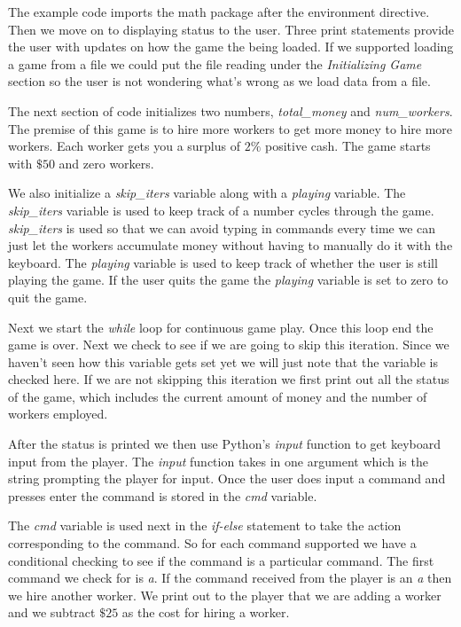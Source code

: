 The example code imports the math package after the environment directive. Then we move on to displaying status to the user. Three print statements provide the user with updates on how the game the being loaded. If we supported loading a game from a file we could put the file reading under the \emph{Initializing Game} section so the user is not wondering what's wrong as we load data from a file. 

The next section of code initializes two numbers, \emph{total\_money} and \emph{num\_workers}. The premise of this game is to hire more workers to get more money to hire more workers. Each worker gets you a surplus of $2\%$ positive cash. The game starts with $\$50$ and zero workers. 

We also initialize a \emph{skip\_iters} variable along with a \emph{playing} variable. The \emph{skip\_iters} variable is used to keep track of a number cycles through the game. \emph{skip\_iters} is used so that we can avoid typing in commands every time we can just let the workers accumulate money without having to manually do it with the keyboard. The \emph{playing} variable is used to keep track of whether the user is still playing the game. If the user quits the game the \emph{playing} variable is set to zero to quit the game. 

Next we start the \emph{while} loop for continuous game play. Once this loop end the game is over. Next we check to see if we are going to skip this iteration. Since we haven't seen how this variable gets set yet we will just note that the variable is checked here. If we are not skipping this iteration we first print out all the status of the game, which includes the current amount of money and the number of workers employed. 

After the status is printed we then use Python's \emph{input} function to get keyboard input from the player. The \emph{input} function takes in one argument which is the string prompting the player for input. Once the user does input a command and presses enter the command is stored in the \emph{cmd} variable. 

The \emph{cmd} variable is used next in the \emph{if-else} statement to take the action corresponding to the command. So for each command supported we have a conditional checking to see if the command is a particular command. The first command we check for is \emph{a}. If the command received from the player is an \emph{a} then we hire another worker. We print out to the player that we are adding a worker and we subtract $\$25$ as the cost for hiring a worker. 

